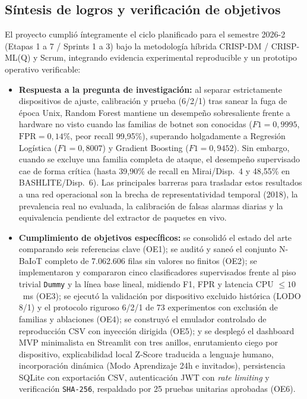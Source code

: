 \documentclass[11pt,a4paper]{article}
\begin{document}
\subsection{Síntesis de logros y verificación de objetivos}
El proyecto cumplió íntegramente el ciclo planificado para el semestre 2026-2 (Etapas 1 a 7 / Sprints 1 a 3) bajo la metodología híbrida CRISP-DM / CRISP-ML(Q) y Scrum, integrando evidencia experimental reproducible y un prototipo operativo verificable:
\begin{itemize}
  \item \textbf{Respuesta a la pregunta de investigación:} al separar estrictamente dispositivos de ajuste, calibración y prueba (6/2/1) tras sanear la fuga de época Unix, Random Forest mantiene un desempeño sobresaliente frente a hardware no visto cuando las familias de botnet son conocidas ($F1 = 0{,}9995$, $\text{FPR} = 0{,}14\%$, peor recall 99,95\%), superando holgadamente a Regresión Logística ($F1 = 0{,}8007$) y Gradient Boosting ($F1 = 0{,}9452$). Sin embargo, cuando se excluye una familia completa de ataque, el desempeño supervisado cae de forma crítica (hasta 39,90\% de recall en Mirai/Disp.~4 y 48,55\% en BASHLITE/Disp.~6). Las principales barreras para trasladar estos resultados a una red operacional son la brecha de representatividad temporal (2018), la prevalencia real no evaluada, la calibración de falsas alarmas diarias y la equivalencia pendiente del extractor de paquetes en vivo.
  \item \textbf{Cumplimiento de objetivos específicos:} se consolidó el estado del arte comparando seis referencias clave (OE1); se auditó y saneó el conjunto N-BaIoT completo de 7.062.606 filas sin valores no finitos (OE2); se implementaron y compararon cinco clasificadores supervisados frente al piso trivial \texttt{Dummy} y la línea base lineal, midiendo F1, FPR y latencia CPU $\le 10$~ms (OE3); se ejecutó la validación por dispositivo excluido histórica (LODO 8/1) y el protocolo riguroso 6/2/1 de 73 experimentos con exclusión de familias y ablaciones (OE4); se construyó el emulador controlado de reproducción CSV con inyección dirigida (OE5); y se desplegó el dashboard MVP minimalista en Streamlit con tres anillos, enrutamiento ciego por dispositivo, explicabilidad local Z-Score traducida a lenguaje humano, incorporación dinámica (Modo Aprendizaje 24h e invitados), persistencia SQLite con exportación CSV, autenticación JWT con \textit{rate limiting} y verificación \texttt{SHA-256}, respaldado por 25 pruebas unitarias aprobadas (OE6).
\end{itemize}
\end{document}
